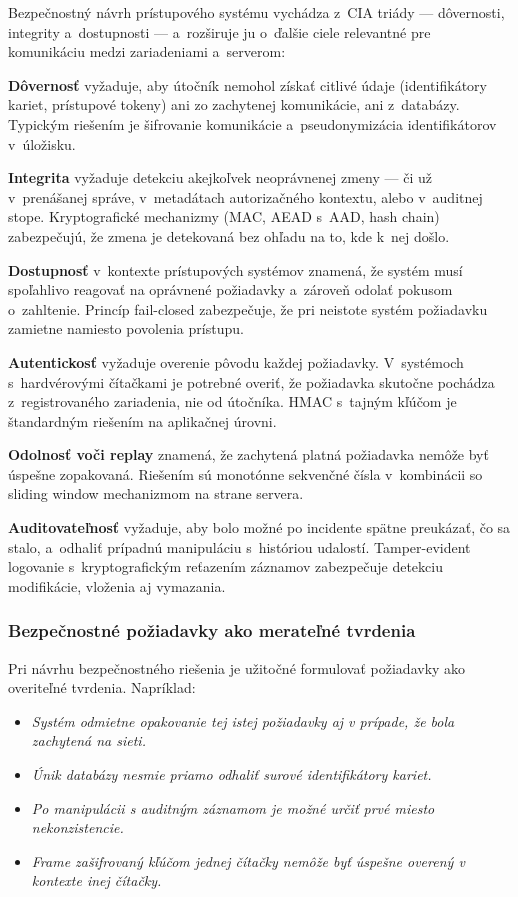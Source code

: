 Bezpečnostný návrh prístupového systému vychádza z~CIA triády\cite{ISO27001} --- dôvernosti, integrity a~dostupnosti --- a~rozširuje ju o~ďalšie ciele relevantné pre komunikáciu medzi zariadeniami a~serverom:

\textbf{Dôvernosť} vyžaduje, aby útočník nemohol získať citlivé údaje (identifikátory kariet, prístupové tokeny) ani zo zachytenej komunikácie, ani z~databázy. Typickým riešením je šifrovanie komunikácie a~pseudonymizácia identifikátorov v~úložisku.

\textbf{Integrita} vyžaduje detekciu akejkoľvek neoprávnenej zmeny --- či už v~prenášanej správe, v~metadátach autorizačného kontextu, alebo v~auditnej stope. Kryptografické mechanizmy (MAC, AEAD s~AAD, hash chain) zabezpečujú, že zmena je detekovaná bez ohľadu na to, kde k~nej došlo.

\textbf{Dostupnosť} v~kontexte prístupových systémov znamená, že systém musí spoľahlivo reagovať na oprávnené požiadavky a~zároveň odolať pokusom o~zahltenie. Princíp fail-closed zabezpečuje, že pri neistote systém požiadavku zamietne namiesto povolenia prístupu.

\textbf{Autentickosť} vyžaduje overenie pôvodu každej požiadavky. V~systémoch s~hardvérovými čítačkami je potrebné overiť, že požiadavka skutočne pochádza z~registrovaného zariadenia, nie od útočníka. HMAC s~tajným kľúčom je štandardným riešením na aplikačnej úrovni\cite{FIPS1981}.

\textbf{Odolnosť voči replay} znamená, že zachytená platná požiadavka nemôže byť úspešne zopakovaná. Riešením sú monotónne sekvenčné čísla v~kombinácii so sliding window mechanizmom na strane servera.

\textbf{Auditovateľnosť} vyžaduje, aby bolo možné po incidente spätne preukázať, čo sa stalo, a~odhaliť prípadnú manipuláciu s~históriou udalostí. Tamper-evident logovanie s~kryptografickým reťazením záznamov\cite{SchneierKelsey1999} zabezpečuje detekciu modifikácie, vloženia aj vymazania.

\subsubsection{Bezpečnostné požiadavky ako merateľné tvrdenia}

Pri návrhu bezpečnostného riešenia je užitočné formulovať požiadavky ako overiteľné tvrdenia. Napríklad:

\begin{itemize}[leftmargin=*,itemsep=2pt]
  \item \emph{Systém odmietne opakovanie tej istej požiadavky aj v prípade, že bola zachytená na sieti.}
  \item \emph{Únik databázy nesmie priamo odhaliť surové identifikátory kariet.}
  \item \emph{Po manipulácii s auditným záznamom je možné určiť prvé miesto nekonzistencie.}
  \item \emph{Frame zašifrovaný kľúčom jednej čítačky nemôže byť úspešne overený v kontexte inej čítačky.}
\end{itemize}

